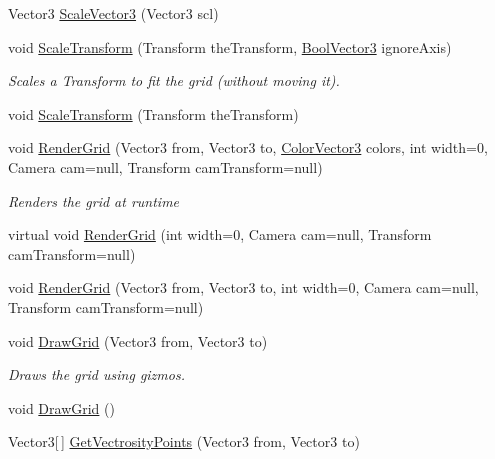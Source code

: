 \begin{DoxyCompactItemize}
Vector3 \hyperlink{class_g_f_grid_a79275b32044dd28cbc80174717390edb_a79275b32044dd28cbc80174717390edb}{Scale\+Vector3} (Vector3 scl)
\item 
void \hyperlink{class_g_f_grid_a20dfd543d80edf6215e7e601cb578ccf_a20dfd543d80edf6215e7e601cb578ccf}{Scale\+Transform} (Transform the\+Transform, \hyperlink{class_grid_framework_1_1_vectors_1_1_bool_vector3}{Bool\+Vector3} ignore\+Axis)
\begin{DoxyCompactList}\small\item\em Scales a Transform to fit the grid (without moving it).\end{DoxyCompactList}\item 
void \hyperlink{class_g_f_grid_a9ad5045b098fde4cea93afeadc1c419d_a9ad5045b098fde4cea93afeadc1c419d}{Scale\+Transform} (Transform the\+Transform)
\item 
void \hyperlink{class_g_f_grid_afe4760ba702ce1e54996f5750501f01f_afe4760ba702ce1e54996f5750501f01f}{Render\+Grid} (Vector3 from, Vector3 to, \hyperlink{class_grid_framework_1_1_vectors_1_1_color_vector3}{Color\+Vector3} colors, int width=0, Camera cam=null, Transform cam\+Transform=null)
\begin{DoxyCompactList}\small\item\em Renders the grid at runtime\end{DoxyCompactList}\item 
virtual void \hyperlink{class_g_f_grid_a24008f73b2c2ce9d6a699d25df998055_a24008f73b2c2ce9d6a699d25df998055}{Render\+Grid} (int width=0, Camera cam=null, Transform cam\+Transform=null)
\item 
void \hyperlink{class_g_f_grid_af700a9a1f9e9f312b1eb55eb8752253c_af700a9a1f9e9f312b1eb55eb8752253c}{Render\+Grid} (Vector3 from, Vector3 to, int width=0, Camera cam=null, Transform cam\+Transform=null)
\item 
void \hyperlink{class_g_f_grid_a150a203272b059999baa0eb3b8a74b09_a150a203272b059999baa0eb3b8a74b09}{Draw\+Grid} (Vector3 from, Vector3 to)
\begin{DoxyCompactList}\small\item\em Draws the grid using gizmos.\end{DoxyCompactList}\item 
void \hyperlink{class_g_f_grid_ae151fe7e54efa0fedaa5e67da1077682_ae151fe7e54efa0fedaa5e67da1077682}{Draw\+Grid} ()
\item 
Vector3\mbox{[}$\,$\mbox{]} \hyperlink{class_g_f_grid_a21a5ed4cfa330e04e6ce8c951744b839_a21a5ed4cfa330e04e6ce8c951744b839}{Get\+Vectrosity\+Points} (Vector3 from, Vector3 to)

\end{DoxyCompactItemize}
